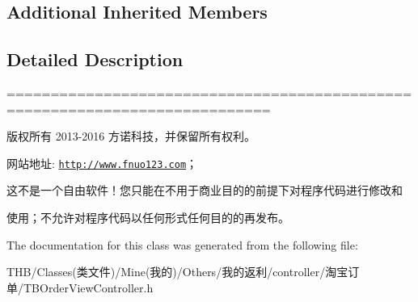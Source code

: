 \subsection*{Additional Inherited Members}


\subsection{Detailed Description}
============================================================================

版权所有 2013-\/2016 方诺科技，并保留所有权利。

网站地址\+: \href{http://www.fnuo123.com}{\tt http\+://www.\+fnuo123.\+com}； 



这不是一个自由软件！您只能在不用于商业目的的前提下对程序代码进行修改和

使用；不允许对程序代码以任何形式任何目的的再发布。 

 

The documentation for this class was generated from the following file\+:\begin{DoxyCompactItemize}
\item 
T\+H\+B/\+Classes(类文件)/\+Mine(我的)/\+Others/我的返利/controller/淘宝订单/T\+B\+Order\+View\+Controller.\+h\end{DoxyCompactItemize}
